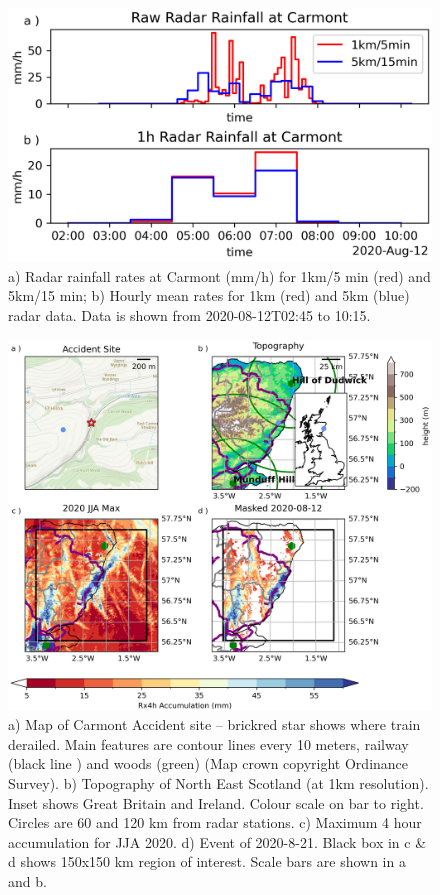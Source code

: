 \documentclass[11pt,a4paper]{article}
\begin{document}
\begin{figure}[tp]
	\centering
	\includegraphics[width=0.5\linewidth]{radar_carmont.png}
	\caption{a) Radar rainfall rates at Carmont (mm/h) for 1km/5 min (red) and 5km/15 min; b) Hourly mean rates for 1km (red) and 5km (blue) radar data. Data is shown from 2020-08-12T02:45 to 10:15. }
	\label{fig:aug2020_rain}
\end{figure}

\begin{figure}[tp]
	
	\centering
	\includegraphics[width=\linewidth]{carmont_geog_group.png}
	\caption{a) Map of Carmont Accident site -- brickred star shows where train derailed. Main features are contour lines every 10 meters, railway (black line ) and woods (green) (Map crown copyright Ordinance Survey). b) Topography of North East Scotland (at 1km resolution). Inset shows Great Britain and Ireland. Colour scale on bar to right. Circles are  60 and 120 km from radar stations.  c) Maximum 4 hour accumulation  for JJA 2020. d) Event of 2020-8-21.  Black box in c \& d shows 150x150 km region of interest. Scale bars are shown in a and b.   }
	\label{fig:carmont_geog_group}
\end{figure}
\end{document}
